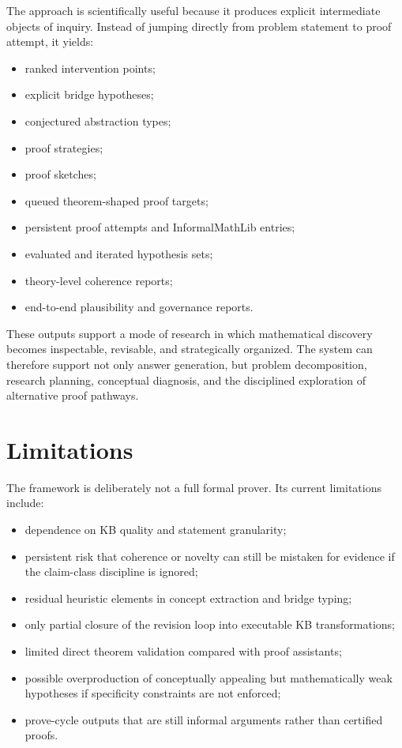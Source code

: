 \documentclass[11pt]{article}
\begin{document}
The approach is scientifically useful because it produces explicit intermediate objects of inquiry. Instead of jumping directly from problem statement to proof attempt, it yields:

\begin{itemize}[leftmargin=*,itemsep=0.2em]
\item ranked intervention points;
\item explicit bridge hypotheses;
\item conjectured abstraction types;
\item proof strategies;
\item proof sketches;
\item queued theorem-shaped proof targets;
\item persistent proof attempts and InformalMathLib entries;
\item evaluated and iterated hypothesis sets;
\item theory-level coherence reports;
\item end-to-end plausibility and governance reports.
\end{itemize}

These outputs support a mode of research in which mathematical discovery becomes inspectable, revisable, and strategically organized. The system can therefore support not only answer generation, but problem decomposition, research planning, conceptual diagnosis, and the disciplined exploration of alternative proof pathways.

\section{Limitations}

The framework is deliberately not a full formal prover. Its current limitations include:

\begin{itemize}[leftmargin=*,itemsep=0.2em]
\item dependence on KB quality and statement granularity;
\item persistent risk that coherence or novelty can still be mistaken for evidence if the claim-class discipline is ignored;
\item residual heuristic elements in concept extraction and bridge typing;
\item only partial closure of the revision loop into executable KB transformations;
\item limited direct theorem validation compared with proof assistants;
\item possible overproduction of conceptually appealing but mathematically weak hypotheses if specificity constraints are not enforced;
\item prove-cycle outputs that are still informal arguments rather than certified proofs.
\end{itemize}
\end{document}
